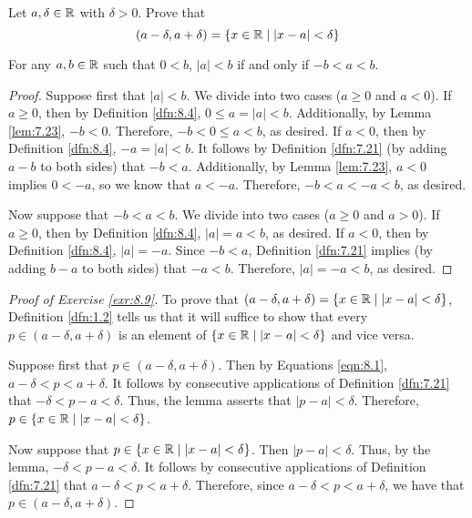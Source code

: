 \documentclass[../main.tex]{subfiles}
\begin{document}
\begin{exercise}\label{exr:8.9}
    Let $a,\delta\in\mathbb{R}$ with $\delta>0$. Prove that
    \begin{equation*}
        (a-\delta,a+\delta) = \{x\in\mathbb{R}\mid|x-a|<\delta\}
    \end{equation*}
    \begin{lemma*}
        For any $a,b\in\mathbb{R}$ such that $0<b$, $|a|<b$ if and only if $-b<a<b$.
        \begin{proof}
            Suppose first that $|a|<b$. We divide into two cases ($a\geq 0$ and $a<0$). If $a\geq 0$, then by Definition \ref{dfn:8.4}, $0\leq a=|a|<b$. Additionally, by Lemma \ref{lem:7.23}, $-b<0$. Therefore, $-b<0\leq a<b$, as desired. If $a<0$, then by Definition \ref{dfn:8.4}, $-a=|a|<b$. It follows by Definition \ref{dfn:7.21} (by adding $a-b$ to both sides) that $-b<a$. Additionally, by Lemma \ref{lem:7.23}, $a<0$ implies $0<-a$, so we know that $a<-a$. Therefore, $-b<a<-a<b$, as desired.\par
            Now suppose that $-b<a<b$. We divide into two cases ($a\geq 0$ and $a>0$). If $a\geq 0$, then by Definition \ref{dfn:8.4}, $|a|=a<b$, as desired. If $a<0$, then by Definition \ref{dfn:8.4}, $|a|=-a$. Since $-b<a$, Definition \ref{dfn:7.21} implies (by adding $b-a$ to both sides) that $-a<b$. Therefore, $|a|=-a<b$, as desired.
        \end{proof}
    \end{lemma*}
    \begin{proof}[Proof of Exercise \ref{exr:8.9}]
        To prove that $(a-\delta,a+\delta)=\{x\in\mathbb{R}\mid|x-a|<\delta\}$, Definition \ref{dfn:1.2} tells us that it will suffice to show that every $p\in(a-\delta,a+\delta)$ is an element of $\{x\in\mathbb{R}\mid|x-a|<\delta\}$ and vice versa.\par
        Suppose first that $p\in(a-\delta,a+\delta)$. Then by Equations \ref{eqn:8.1}, $a-\delta<p<a+\delta$. It follows by consecutive applications of Definition \ref{dfn:7.21} that $-\delta<p-a<\delta$. Thus, the lemma asserts that $|p-a|<\delta$. Therefore, $p\in\{x\in\mathbb{R}\mid|x-a|<\delta\}$.\par
        Now suppose that $p\in\{x\in\mathbb{R}\mid|x-a|<\delta\}$. Then $|p-a|<\delta$. Thus, by the lemma, $-\delta<p-a<\delta$. It follows by consecutive applications of Definition \ref{dfn:7.21} that $a-\delta<p<a+\delta$. Therefore, since $a-\delta<p<a+\delta$, we have that $p\in(a-\delta,a+\delta)$.
    \end{proof}
\end{exercise}
\end{document}

